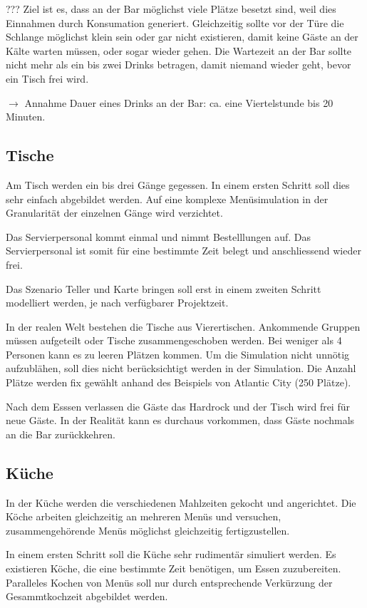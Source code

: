\documentclass[ngerman,a4paper,12pt]{scrreprt}
\begin{document}
???
Ziel ist es, dass an der Bar möglichst viele Plätze besetzt sind, weil dies Einnahmen durch Konsumation generiert. Gleichzeitig sollte vor der Türe die Schlange möglichst klein sein oder gar nicht existieren, damit keine Gäste an der Kälte warten müssen, oder sogar wieder gehen. Die Wartezeit an der Bar sollte nicht mehr als ein bis zwei Drinks betragen, damit niemand wieder geht, bevor ein Tisch frei wird.

$\rightarrow$ Annahme Dauer eines Drinks an der Bar: ca. eine Viertelstunde bis 20 Minuten.

\subsection{Tische}
Am Tisch werden ein bis drei Gänge gegessen. In einem ersten Schritt soll dies sehr einfach abgebildet werden. Auf eine komplexe Menüsimulation in der Granularität der einzelnen Gänge wird verzichtet.

Das Servierpersonal kommt einmal und nimmt Bestelllungen auf. Das Servierpersonal ist somit für eine bestimmte Zeit belegt und anschliessend wieder frei. 

Das Szenario Teller und Karte bringen soll erst in einem zweiten Schritt modelliert werden, je nach verfügbarer Projektzeit.

In der realen Welt bestehen die Tische aus Vierertischen. Ankommende Gruppen müssen aufgeteilt oder Tische zusammengeschoben werden. Bei weniger als 4 Personen kann es zu leeren Plätzen kommen. Um die Simulation nicht unnötig aufzublähen, soll dies nicht berücksichtigt werden in der Simulation.
Die Anzahl Plätze werden fix gewählt anhand des Beispiels von Atlantic City (250 Plätze).

Nach dem Esssen  verlassen die Gäste das Hardrock und der Tisch wird frei für neue Gäste.
In der Realität kann es durchaus vorkommen, dass Gäste nochmals an die Bar zurückkehren.


\subsection{Küche}
	In der Küche werden die verschiedenen Mahlzeiten gekocht und angerichtet. Die Köche arbeiten gleichzeitig an mehreren Menüs und versuchen, zusammengehörende Menüs möglichst gleichzeitig fertigzustellen.

	In einem ersten Schritt soll die Küche sehr rudimentär simuliert werden. Es existieren Köche, die eine bestimmte Zeit benötigen, um Essen zuzubereiten. Paralleles Kochen von Menüs soll nur durch entsprechende Verkürzung der Gesammtkochzeit abgebildet werden.
\end{document}

